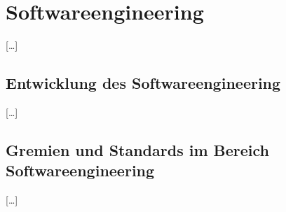 
\thispagestyle{empty}

\newpage

%

%

%	
%	


\chapter{Softwareengineering}
\label{sec:Kap-1}
[\ldots]

\section{Entwicklung des Softwareengineering}
\label{sec:Kap-1.1}
[\ldots]
\label{text:Mahoney}

\section{Gremien und Standards im Bereich Softwareengineering}
\label{sec:Kap-1.2}
[\ldots]
\label{sec:Kap-1.2.2}
\label{sec:Kap-1.2.2:Kompendium}




%

\newpage


